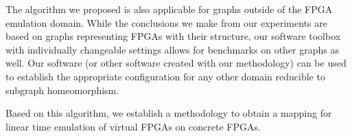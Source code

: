 The algorithm we proposed is also applicable for graphs outside of the FPGA emulation domain. While the conclusions we make from our experiments are based on graphs representing FPGAs with their structure, our software toolbox with individually changeable settings allows for benchmarks on other graphs as well. Our software (or other software created with our methodology) can be used to establish the appropriate configuration for any other domain reducible to subgraph homeomorphism.

Based on this algorithm, we establish a methodology to obtain a mapping for linear time emulation of virtual FPGAs on concrete FPGAs.